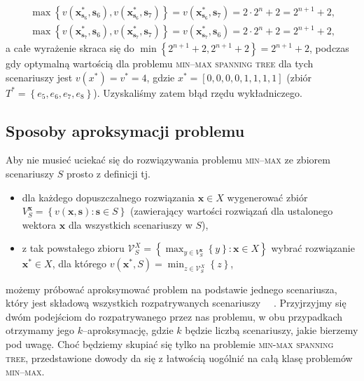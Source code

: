 \begin{eqnarray}
	\max \left\{ v \left( \textbf{x}^{\ast}_{\textbf{s}_{6}}, \textbf{s}_{6} \right), v \left( \textbf{x}^{\ast}_{\textbf{s}_{6}}, \textbf{s}_{7} \right) \right\} = v \left( \textbf{x}^{\ast}_{\textbf{s}_{6}}, \textbf{s}_{7} \right) = 2 \cdot 2^{n} + 2 = 2^{n+1} + 2\text{,} \\
	\max \left\{ v \left( \textbf{x}^{\ast}_{\textbf{s}_{7}}, \textbf{s}_{6} \right), v \left( \textbf{x}^{\ast}_{\textbf{s}_{7}}, \textbf{s}_{7} \right) \right\} = v \left( \textbf{x}^{\ast}_{\textbf{s}_{7}}, \textbf{s}_{6} \right) = 2 \cdot 2^{n} + 2 = 2^{n+1} + 2\text{,}
\end{eqnarray}
a całe wyrażenie skraca się do $\min \left\{ 2^{n+1} + 2, 2^{n+1} + 2  \right\} = 2^{n+1} + 2$, podczas gdy optymalną wartością dla problemu \textsc{min--max spanning tree} dla tych scenariuszy jest $v \left( x^{\ast} \right) = v^{\ast} = 4$, gdzie $x^{\ast} = \left[ 0, 0, 0, 0, 1, 1, 1, 1 \right]$ (zbiór $T^{\ast} = \left\{ e_{5}, e_{6}, e_{7}, e_{8} \right\}$). Uzyskaliśmy zatem błąd rzędu wykładniczego.

\subsection{Sposoby aproksymacji problemu}

Aby nie musieć uciekać się do rozwiązywania problemu \textsc{min--max} ze zbiorem scenariuszy $S$ prosto z definicji tj.

\begin{itemize}
	\item dla każdego dopuszczalnego rozwiązania $\textbf{x} \in X$ wygenerować zbiór $V^{\textbf{x}}_{S} = \left\{ v \left( \textbf{x}, \textbf{s} \right) : \textbf{s} \in S \right\}$ (zawierający wartości rozwiązań dla ustalonego wektora $\textbf{x}$ dla wszystkich scenariuszy w $S$),
	\item z tak powstałego zbioru $\mathcal{V}^{X}_{S} = \left\{ \max_{y \in V^{\textbf{x}}_{S}} \left\{ y \right\} : \textbf{x} \in X  \right\}$ wybrać rozwiązanie $\textbf{x}^{\ast} \in X$, dla którego $v \left( \textbf{x}^{\ast} , S \right) = \min_{z \in \mathcal{V}^{X}_{S}} \left\{ z \right\}$,
\end{itemize}
możemy próbować aproksymować problem na podstawie jednego scenariusza, który jest składową wszystkich rozpatrywanych scenariuszy ~\cite{minmaxApprox}~\cite[$430$]{minmaxSurvey}. Przyjrzyjmy się dwóm podejściom do rozpatrywanego przez nas problemu, w obu przypadkach otrzymamy jego $k$--aproksymację, gdzie $k$ będzie liczbą scenariuszy, jakie bierzemy pod uwagę. Choć będziemy skupiać się tylko na problemie \textsc{min-max spanning tree}, przedstawione dowody da się z łatwością uogólnić na całą klasę problemów \textsc{min--max}.

